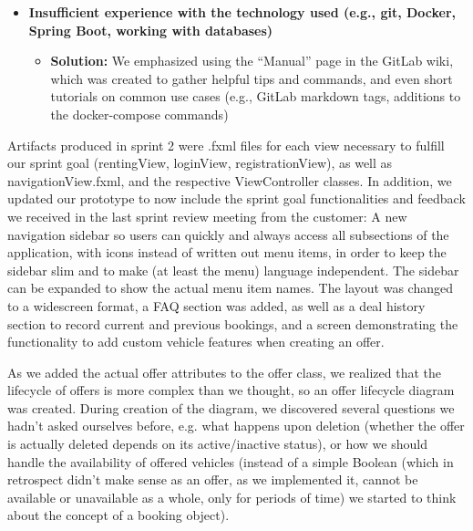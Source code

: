 \begin{itemize}
\begin{itemize}
    \end{itemize}
    \item \textbf{Insufficient experience with the technology used (e.g., git, Docker, Spring Boot, working with databases)}
    \begin{itemize}
        \item \textbf{Solution:} We emphasized using the “Manual” page in the GitLab wiki, which was created to gather helpful tips and commands, and even short tutorials on common use cases (e.g., GitLab markdown tags, additions to the docker-compose commands)
    \end{itemize}
\end{itemize}

Artifacts produced in sprint 2 were .fxml files for each view necessary to fulfill our sprint goal (rentingView, loginView, registrationView), as well as navigationView.fxml, and the respective ViewController classes. In addition, we updated our prototype to now include the sprint goal functionalities and feedback we received in the last sprint review meeting from the customer: A new navigation sidebar so users can quickly and always access all subsections of the application, with icons instead of written out menu items, in order to keep the sidebar slim and to make (at least the menu) language independent. The sidebar can be expanded to show the actual menu item names. The layout was changed to a widescreen format, a FAQ section was added, as well as a deal history section to record current and previous bookings, and a screen demonstrating the functionality to add custom vehicle features when creating an offer.

As we added the actual offer attributes to the offer class, we realized that the lifecycle of offers is more complex than we thought, so an offer lifecycle diagram was created. During creation of the diagram, we discovered several questions we hadn’t asked ourselves before, e.g. what happens upon deletion (whether the offer is actually deleted depends on its active/inactive status), or how we should handle the availability of offered vehicles (instead of a simple Boolean (which in retrospect didn’t make sense as an offer, as we implemented it, cannot be available or unavailable as a whole, only for periods of time) we started to think about the concept of a booking object).


